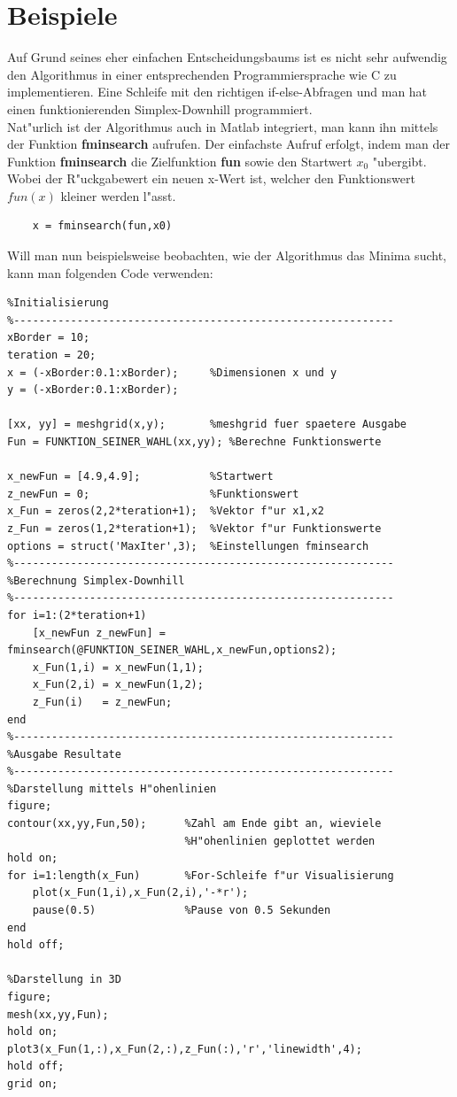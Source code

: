 \section{Beispiele}
Auf Grund seines eher einfachen Entscheidungsbaums ist es nicht sehr aufwendig den Algorithmus in einer entsprechenden Programmiersprache wie C zu implementieren. Eine Schleife mit den richtigen if-else-Abfragen und man hat einen funktionierenden Simplex-Downhill programmiert.\\
Nat"urlich ist der Algorithmus auch in Matlab integriert, man kann ihn mittels der Funktion \textbf{fminsearch} aufrufen. 
Der einfachste Aufruf erfolgt, indem man der Funktion \textbf{fminsearch} die Zielfunktion \textbf{fun} sowie den Startwert \textbf{$x_0$} "ubergibt. Wobei der R"uckgabewert ein neuen x-Wert ist, welcher den Funktionswert $fun(x)$ kleiner werden l"asst. 
\begin{lstlisting}
	x = fminsearch(fun,x0)
\end{lstlisting} 
Will man nun beispielsweise beobachten, wie der Algorithmus das Minima sucht, kann man folgenden Code verwenden: 
\begin{lstlisting}[style=Matlab]
%------------------------------------------------------------
%Initialisierung
%------------------------------------------------------------
xBorder = 10; 
teration = 20; 
x = (-xBorder:0.1:xBorder);     %Dimensionen x und y
y = (-xBorder:0.1:xBorder); 

[xx, yy] = meshgrid(x,y);       %meshgrid fuer spaetere Ausgabe
Fun = FUNKTION_SEINER_WAHL(xx,yy); %Berechne Funktionswerte

x_newFun = [4.9,4.9];           %Startwert
z_newFun = 0;                   %Funktionswert
x_Fun = zeros(2,2*teration+1);  %Vektor f"ur x1,x2
z_Fun = zeros(1,2*teration+1);  %Vektor f"ur Funktionswerte
options = struct('MaxIter',3);  %Einstellungen fminsearch
%------------------------------------------------------------
%Berechnung Simplex-Downhill
%------------------------------------------------------------
for i=1:(2*teration+1)
	[x_newFun z_newFun] = fminsearch(@FUNKTION_SEINER_WAHL,x_newFun,options2);
	x_Fun(1,i) = x_newFun(1,1);
	x_Fun(2,i) = x_newFun(1,2); 
	z_Fun(i)   = z_newFun; 
end
%------------------------------------------------------------
%Ausgabe Resultate
%------------------------------------------------------------
%Darstellung mittels H"ohenlinien
figure; 
contour(xx,yy,Fun,50);      %Zahl am Ende gibt an, wieviele 
                            %H"ohenlinien geplottet werden
hold on; 
for i=1:length(x_Fun)       %For-Schleife f"ur Visualisierung
    plot(x_Fun(1,i),x_Fun(2,i),'-*r'); 
    pause(0.5)              %Pause von 0.5 Sekunden
end
hold off; 

%Darstellung in 3D
figure; 
mesh(xx,yy,Fun);
hold on; 
plot3(x_Fun(1,:),x_Fun(2,:),z_Fun(:),'r','linewidth',4); 
hold off; 
grid on; 
\end{lstlisting}
